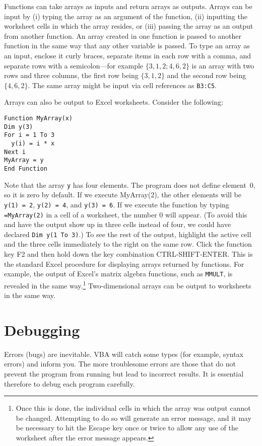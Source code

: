 {Functions can take arrays as inputs and return arrays as outputs. Arrays can be input by (i) typing the array as an argument of the function, (ii) inputting the worksheet cells in which the array resides, or (iii) passing the array as an output from another function.  An array created in one function is passed to another function in the same way that any other variable is passed.  To type an array as an input, enclose it curly braces, separate items in each row with a comma, and separate rows with a semicolon---for example $\{3,1,2; 4,6,2\}$ is an array with two rows and three columns, the first row being $\{3,1,2\}$ and the second row being $\{4,6,2\}$.  The same array might be input via cell references as \verb!B3:C5!.

Arrays can also be output to Excel worksheets.  Consider the following:
\small\begin{verbatim}
Function MyArray(x)
Dim y(3)
For i = 1 To 3
  y(i) = i * x
Next i
MyArray = y
End Function
\end{verbatim}\normalsize
Note that the array \verb!y! has four elements.  The program does not define element~0, so it is zero by default.  If we execute MyArray(2), the other elements will be \verb!y(1) = 2!, \verb!y(2) = 4!, and \verb!y(3) = 6!.   If we execute the function by typing \verb!=MyArray(2)! in a cell of a worksheet, the number 0 will appear. (To avoid this and have the output show up in three cells instead of four, we could have declared \verb!Dim y(1 To 3)!.)   To see the rest of the output, highlight the active cell and the three cells immediately to the right on the same row.  Click the function key F2 and then hold down the key combination CTRL-SHIFT-ENTER.  This is the standard Excel procedure for displaying arrays returned by functions.  For example, the output of Excel's matrix algebra functions, such as \verb!MMULT!, is revealed in the same way.\footnote{Once this is done, the individual cells in which the array was output cannot be changed.  Attempting to do so will generate an error message, and it may be necessary to hit the Escape key once or twice to allow any use of the worksheet after the error message appears.}
Two-dimensional arrays can be output to worksheets in the same way.  

 
 
 \section{Debugging}
Errors (bugs) are inevitable.  VBA will catch some types (for example, syntax errors) and inform you.  The more troublesome errors are those that do not prevent the program from running but lead to incorrect results.  It is essential therefore to debug each program carefully.  

}
